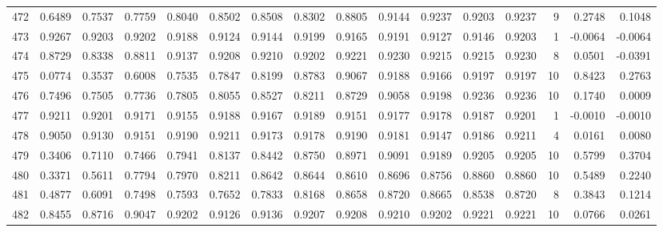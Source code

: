 \begin{tabular}{lrrrrrrrrrrrrrrr}
472 &      0.6489 &  0.7537 &  0.7759 &  0.8040 &  0.8502 &  0.8508 &  0.8302 &  0.8805 &  0.9144 &  0.9237 &   0.9203 &     0.9237 &      9 &                    0.2748 &                     0.1048 \\
473 &      0.9267 &  0.9203 &  0.9202 &  0.9188 &  0.9124 &  0.9144 &  0.9199 &  0.9165 &  0.9191 &  0.9127 &   0.9146 &     0.9203 &      1 &                   -0.0064 &                    -0.0064 \\
474 &      0.8729 &  0.8338 &  0.8811 &  0.9137 &  0.9208 &  0.9210 &  0.9202 &  0.9221 &  0.9230 &  0.9215 &   0.9215 &     0.9230 &      8 &                    0.0501 &                    -0.0391 \\
475 &      0.0774 &  0.3537 &  0.6008 &  0.7535 &  0.7847 &  0.8199 &  0.8783 &  0.9067 &  0.9188 &  0.9166 &   0.9197 &     0.9197 &     10 &                    0.8423 &                     0.2763 \\
476 &      0.7496 &  0.7505 &  0.7736 &  0.7805 &  0.8055 &  0.8527 &  0.8211 &  0.8729 &  0.9058 &  0.9198 &   0.9236 &     0.9236 &     10 &                    0.1740 &                     0.0009 \\
477 &      0.9211 &  0.9201 &  0.9171 &  0.9155 &  0.9188 &  0.9167 &  0.9189 &  0.9151 &  0.9177 &  0.9178 &   0.9187 &     0.9201 &      1 &                   -0.0010 &                    -0.0010 \\
478 &      0.9050 &  0.9130 &  0.9151 &  0.9190 &  0.9211 &  0.9173 &  0.9178 &  0.9190 &  0.9181 &  0.9147 &   0.9186 &     0.9211 &      4 &                    0.0161 &                     0.0080 \\
479 &      0.3406 &  0.7110 &  0.7466 &  0.7941 &  0.8137 &  0.8442 &  0.8750 &  0.8971 &  0.9091 &  0.9189 &   0.9205 &     0.9205 &     10 &                    0.5799 &                     0.3704 \\
480 &      0.3371 &  0.5611 &  0.7794 &  0.7970 &  0.8211 &  0.8642 &  0.8644 &  0.8610 &  0.8696 &  0.8756 &   0.8860 &     0.8860 &     10 &                    0.5489 &                     0.2240 \\
481 &      0.4877 &  0.6091 &  0.7498 &  0.7593 &  0.7652 &  0.7833 &  0.8168 &  0.8658 &  0.8720 &  0.8665 &   0.8538 &     0.8720 &      8 &                    0.3843 &                     0.1214 \\
482 &      0.8455 &  0.8716 &  0.9047 &  0.9202 &  0.9126 &  0.9136 &  0.9207 &  0.9208 &  0.9210 &  0.9202 &   0.9221 &     0.9221 &     10 &                    0.0766 &                     0.0261 \\

\end{tabular}
